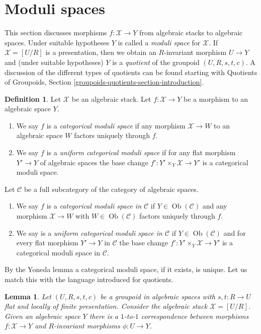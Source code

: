 \documentclass{stacks-project}
\theoremstyle{plain}
\newtheorem{lemma}[subsection]{Lemma}
\theoremstyle{definition}
\newtheorem{definition}[subsection]{Definition}
\theoremstyle{remark}
\numberwithin{equation}{subsection}
\def\Ob{\mathop{\mathrm{Ob}}\nolimits}
\begin{document}
\section{Moduli spaces}
\label{section-moduli-spaces}

\noindent
This section discusses morphisms $f : \mathcal{X} \to Y$ from
algebraic stacks to algebraic spaces. Under suitable hypotheses
$Y$ is called a {\it moduli space} for $\mathcal{X}$. If
$\mathcal{X} = [U/R]$ is a presentation, then we obtain an
$R$-invariant morphism $U \to Y$ and (under suitable hypotheses)
$Y$ is a {\it quotient} of the groupoid $(U, R, s, t, c)$.
A discussion of the different types of quotients can be found
starting with
Quotients of Groupoids, Section \ref{groupoids-quotients-section-introduction}.

\begin{definition}
\label{definition-categorical-quotient}
Let $\mathcal{X}$ be an algebraic stack. Let
$f : \mathcal{X} \to Y$ be a morphism to an algebraic space $Y$.
\begin{enumerate}
\item We say $f$ is a {\it categorical moduli space} if any morphism
$\mathcal{X} \to W$ to an algebraic space $W$ factors uniquely through $f$.
\item We say $f$ is a {\it uniform categorical moduli space}
if for any flat morphism $Y' \to Y$ of algebraic spaces the base change
$f' : Y' \times_Y \mathcal{X} \to Y'$ is a categorical moduli space.
\end{enumerate}
Let $\mathcal{C}$ be a full subcategory of the category of algebraic
spaces.
\begin{enumerate}
\item[(3)] We say $f$ is a {\it categorical moduli space in $\mathcal{C}$}
if $Y \in \Ob(\mathcal{C})$ and any morphism $\mathcal{X} \to W$ with
$W \in \Ob(\mathcal{C})$ factors uniquely through $f$.
\item[(4)] We say is a {\it uniform categorical moduli space in $\mathcal{C}$}
if $Y \in \Ob(\mathcal{C})$ and for every flat morphism $Y' \to Y$ in
$\mathcal{C}$ the base change $f' : Y' \times_Y \mathcal{X} \to Y'$ is a
categorical moduli space in $\mathcal{C}$.
\end{enumerate}
\end{definition}

\noindent
By the Yoneda lemma a categorical moduli space, if it exists, is unique.
Let us match this with the language introduced for quotients.

\begin{lemma}
\label{lemma-quotient-compare}
Let $(U, R, s, t, c)$ be a groupoid in algebraic spaces with
$s, t : R \to U$ flat and locally of finite presentation.
Consider the algebraic stack $\mathcal{X} = [U/R]$.
Given an algebraic space $Y$ there is a $1$-to-$1$ correspondence between
morphisms $f : \mathcal{X} \to Y$ and $R$-invariant morphisms
$\phi : U \to Y$.
\end{lemma}
\end{document}
